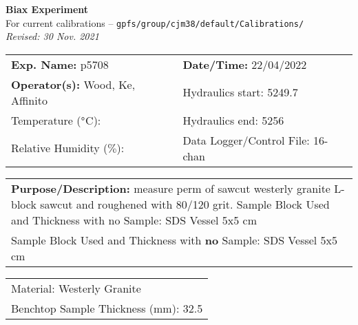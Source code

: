 \documentclass[letterpaper, 10pt]{article}
\begin{document}
\begin{center}
    {\Large \textbf{Biax Experiment}}\\
    {\small For current calibrations -- \texttt{gpfs/group/cjm38/default/Calibrations/}}\\
    {\footnotesize \textit{Revised: 30 Nov. 2021}}
\end{center}



\begin{table}[!ht]
	\renewcommand{\arraystretch}{1.1}
	\begin{tabular}{p{10cm} p{10cm} }
	    \textbf{Exp. Name: }p5708 & \textbf{Date/Time: }22/04/2022\\
	    \textbf{Operator(s): }Wood, Ke, Affinito & Hydraulics start: 5249.7 \\
	    Temperature ($\degree$C):  & Hydraulics end: 5256 \\
	    Relative Humidity ($\%$):  & Data Logger/Control File: 16-chan \\
	\end{tabular}
\end{table} 
\vspace{-0.5cm} 

\begin{table}[!ht]
	\renewcommand{\arraystretch}{1.1}
	\begin{tabular}{p{20cm}}\textbf{Purpose/Description:} measure perm of sawcut westerly granite L-block sawcut and roughened with 80/120 grit. Sample Block Used and Thickness with no Sample: SDS Vessel 5x5 cm \\Sample Block Used and Thickness with \textbf{no} Sample: SDS Vessel 5x5 cm \\
	\end{tabular}
    \end{table} \vspace{-0.5cm} 

\begin{table}[!ht]
        \small
        \renewcommand{\arraystretch}{1.2}
        \begin{tabular}{ |p{7cm}| } \hline 
Material: Westerly Granite \\Benchtop Sample Thickness (mm): 32.5 \\ \hline \end{tabular} \end{table} \vspace{-0.5cm} 
\end{document}
